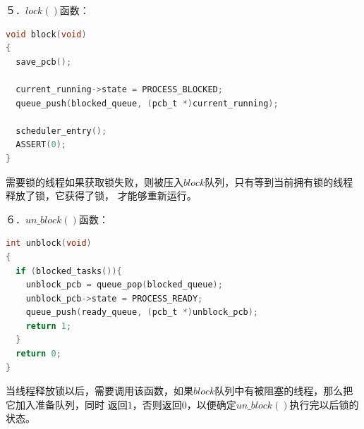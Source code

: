 \documentclass[UTF8,noindent]{ctexart}
\begin{document}
５．$lock()$函数：
\begin{lstlisting}[language=c]
void block(void)
{
  save_pcb();

  current_running->state = PROCESS_BLOCKED;
  queue_push(blocked_queue, (pcb_t *)current_running);

  scheduler_entry();
  ASSERT(0);
}
\end{lstlisting}
需要锁的线程如果获取锁失败，则被压入$block$队列，只有等到当前拥有锁的线程释放了锁，它获得了锁，
才能够重新运行。

６．$un\_block()$函数：
\begin{lstlisting}[language=c]
int unblock(void)
{
  if (blocked_tasks()){
    unblock_pcb = queue_pop(blocked_queue);
    unblock_pcb->state = PROCESS_READY;
    queue_push(ready_queue, (pcb_t *)unblock_pcb);
    return 1;
  }
  return 0;
}
\end{lstlisting}
当线程释放锁以后，需要调用该函数，如果$block$队列中有被阻塞的线程，那么把它加入准备队列，同时
返回$1$，否则返回$0$，以便确定$un\_block()$执行完以后锁的状态。
\end{document}
